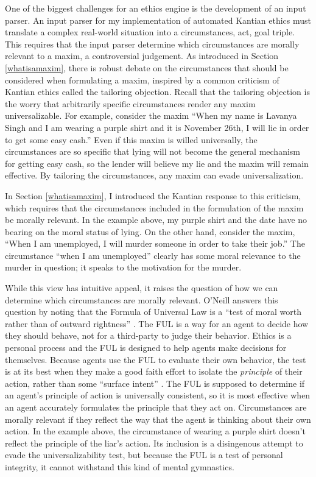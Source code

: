 \begin{isabellebody}
\begin{isamarkuptext}
One of the biggest challenges for an ethics engine is the development of an input parser. An input parser 
for my implementation of automated Kantian ethics must translate a complex real-world situation into a 
circumstances, act, goal triple.
This requires that the input parser determine which circumstances are morally relevant
to a maxim, a controversial judgement. As introduced in Section \ref{whatisamaxim},
there is robust debate on the circumstances that should be considered when formulating a maxim, 
inspired by a common criticism of Kantian ethics called the tailoring objection. Recall that the 
tailoring objection is the worry that arbitrarily specific 
circumstances render any maxim universalizable. For example, consider the maxim ``When my name is Lavanya Singh 
and I am wearing a purple shirt and it is November 26th, I will lie in order to get some easy cash.'' 
Even if this maxim is willed universally, the circumstances are so 
specific that lying will not become the general mechanism for getting easy cash, so the lender will 
believe my lie and the maxim will remain effective. By tailoring the circumstances, any maxim can 
evade universalization.

In Section \ref{whatisamaxim}, I introduced the Kantian response to this criticism, which requires that 
the circumstances included in the formulation
of the maxim be morally relevant. In the example above, my purple shirt and the date have no bearing on 
the moral status of lying. On the other hand, consider the maxim, ``When I am unemployed, I will murder
someone in order to take their job.'' The circumstance ``when I am unemployed'' clearly has some moral
relevance to the murder in question; it speaks to the motivation for the murder. 

While this view has intuitive appeal, it raises the question of how we can determine
which circumstances are morally relevant. O'Neill answers this question
by noting that the Formula of Universal Law is
a ``test of moral worth rather than of outward rightness'' \citep[98]{constofreason}. The FUL is a way 
for an agent to decide how they should behave, not for a third-party to judge their behavior. Ethics is 
a personal process and the FUL is designed to help agents make decisions for themselves. Because agents use 
the FUL to evaluate their own behavior, the test is at its 
best when they make a good faith effort to isolate the \emph{principle} of their action, rather than some
``surface intent'' \citep[87]{constofreason}. The FUL is supposed to determine if an agent's principle of action
is universally consistent, so it is most effective when an agent accurately formulates the principle that
they act on. Circumstances are morally relevant if they reflect the way that the agent is 
thinking about their own action. In the example above, the circumstance of wearing a purple shirt doesn't reflect
the principle of the liar's action. Its inclusion is a disingenous attempt to evade the universalizability
test, but because the FUL is a test of personal integrity, it cannot withstand this kind of mental
gymnastics. 
 

\end{isamarkuptext}
\end{isabellebody}
